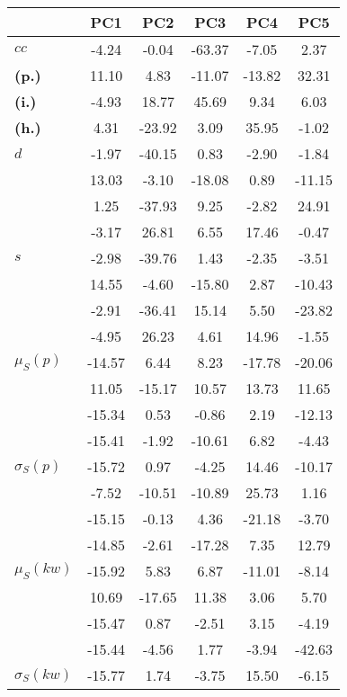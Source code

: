 \begin{table}[h!]
\begin{center}
\begin{tabular}{| l || c | c | c | c | c |}\hline
 & {\bf PC1} & {\bf PC2} & {\bf PC3} & {\bf PC4} & {\bf PC5} \\\hline\hline
{\bf $cc$} & -4.24 & -0.04 & -63.37 & -7.05 & 2.37 \\
{\bf (p.)} & 11.10 & 4.83 & -11.07 & -13.82 & 32.31 \\
{\bf (i.)} & -4.93 & 18.77 & 45.69 & 9.34 & 6.03 \\
{\bf (h.)} & 4.31 & -23.92 & 3.09 & 35.95 & -1.02 \\\hline
{\bf $d$} & -1.97 & -40.15 & 0.83 & -2.90 & -1.84 \\
{\bf } & 13.03 & -3.10 & -18.08 & 0.89 & -11.15 \\
{\bf } & 1.25 & -37.93 & 9.25 & -2.82 & 24.91 \\
{\bf } & -3.17 & 26.81 & 6.55 & 17.46 & -0.47 \\\hline
{\bf $s$} & -2.98 & -39.76 & 1.43 & -2.35 & -3.51 \\
{\bf } & 14.55 & -4.60 & -15.80 & 2.87 & -10.43 \\
 & -2.91  & -36.41  & 15.14  & 5.50  & -23.82 \\
 & -4.95  & 26.23  & 4.61  & 14.96  & -1.55 \\\hline
$\mu_S(p)$ & -14.57  & 6.44  & 8.23  & -17.78  & -20.06 \\
 & 11.05  & -15.17  & 10.57  & 13.73  & 11.65 \\
 & -15.34  & 0.53  & -0.86  & 2.19  & -12.13 \\
 & -15.41  & -1.92  & -10.61  & 6.82  & -4.43 \\\hline
$\sigma_S(p)$ & -15.72  & 0.97  & -4.25  & 14.46  & -10.17 \\
 & -7.52  & -10.51  & -10.89  & 25.73  & 1.16 \\
 & -15.15  & -0.13  & 4.36  & -21.18  & -3.70 \\
 & -14.85  & -2.61  & -17.28  & 7.35  & 12.79 \\\hline
$\mu_S(kw)$ & -15.92  & 5.83  & 6.87  & -11.01  & -8.14 \\
 & 10.69  & -17.65  & 11.38  & 3.06  & 5.70 \\
 & -15.47  & 0.87  & -2.51  & 3.15  & -4.19 \\
 & -15.44  & -4.56  & 1.77  & -3.94  & -42.63 \\\hline
$\sigma_S(kw)$ & -15.77  & 1.74  & -3.75  & 15.50  & -6.15 \\

\end{tabular}
\end{center}
\end{table}
